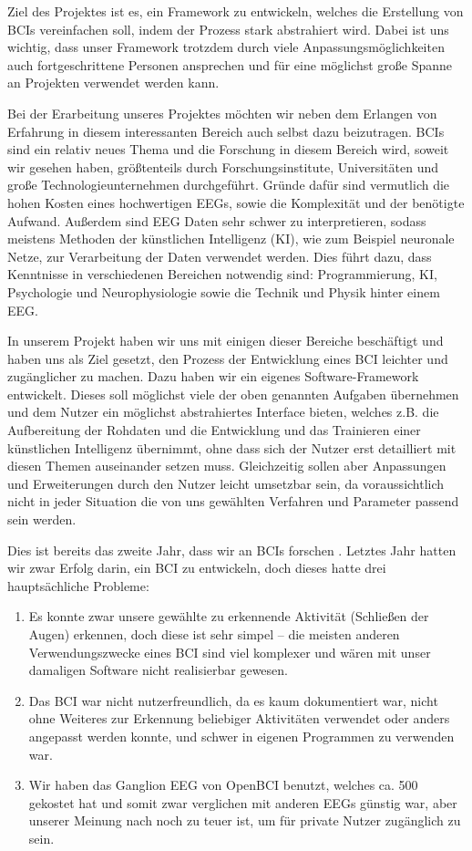 \documentclass[10pt]{article}
\begin{document}
Ziel des Projektes ist es, ein Framework zu entwickeln, welches die Erstellung von BCIs vereinfachen soll, indem der Prozess stark abstrahiert wird.
Dabei ist uns wichtig, dass unser Framework trotzdem durch viele Anpassungsmöglichkeiten auch fortgeschrittene Personen ansprechen und für eine möglichst große Spanne an Projekten verwendet werden kann.
	
Bei der Erarbeitung unseres Projektes möchten wir neben dem Erlangen von Erfahrung in diesem interessanten Bereich auch selbst dazu beizutragen.
BCIs sind ein relativ neues Thema und die Forschung in diesem Bereich wird, soweit wir gesehen haben, größtenteils durch Forschungsinstitute, Universitäten und große Technologieunternehmen durchgeführt.
Gründe dafür sind vermutlich die hohen Kosten eines hochwertigen EEGs, sowie die Komplexität und der benötigte Aufwand. Außerdem sind EEG Daten sehr schwer zu interpretieren, sodass meistens Methoden der künstlichen Intelligenz (KI), wie zum Beispiel neuronale Netze, zur Verarbeitung der Daten verwendet werden.
Dies führt dazu, dass Kenntnisse in verschiedenen Bereichen notwendig sind: Programmierung, KI, Psychologie und Neurophysiologie sowie die Technik und Physik hinter einem EEG.

In unserem Projekt haben wir uns mit einigen dieser Bereiche beschäftigt und haben uns als Ziel gesetzt, den Prozess der Entwicklung eines BCI leichter und zugänglicher zu machen. Dazu haben wir ein eigenes Software-Framework entwickelt. 
Dieses soll möglichst viele der oben genannten Aufgaben übernehmen und dem Nutzer ein möglichst abstrahiertes Interface bieten, welches z.B. die Aufbereitung der Rohdaten und die Entwicklung und das Trainieren einer künstlichen Intelligenz übernimmt, ohne dass sich der Nutzer erst detailliert mit diesen Themen auseinander setzen muss.
Gleichzeitig sollen aber Anpassungen und Erweiterungen durch den Nutzer leicht umsetzbar sein, da voraussichtlich nicht in jeder Situation die von uns gewählten Verfahren und Parameter passend sein werden.

Dies ist bereits das zweite Jahr, dass wir an BCIs forschen \cite{Bericht}.
Letztes Jahr hatten wir zwar Erfolg darin, ein BCI zu entwickeln, doch dieses hatte drei hauptsächliche Probleme:

\begin{enumerate}
    \item Es konnte zwar unsere gewählte zu erkennende Aktivität (Schließen der Augen) erkennen, doch diese ist sehr simpel -- die meisten anderen Verwendungszwecke eines BCI sind viel komplexer und wären mit unser damaligen Software nicht realisierbar gewesen.
    \item Das BCI war nicht nutzerfreundlich, da es kaum dokumentiert war, nicht ohne Weiteres zur Erkennung beliebiger Aktivitäten verwendet oder anders angepasst werden konnte, und schwer in eigenen Programmen zu verwenden war.
    \item Wir haben das Ganglion EEG von OpenBCI benutzt, welches ca. \SI{500}{\eur} gekostet hat und somit zwar verglichen mit anderen EEGs günstig war, aber unserer Meinung nach noch zu teuer ist, um für private Nutzer zugänglich zu sein.
\end{enumerate}
\end{document}
